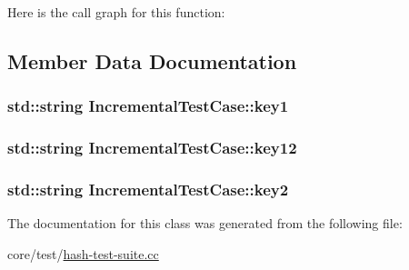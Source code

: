 Here is the call graph for this function\+:




\subsection{Member Data Documentation}
\subsubsection[{\texorpdfstring{key1}{key1}}]{\setlength{\rightskip}{0pt plus 5cm}std\+::string Incremental\+Test\+Case\+::key1\hspace{0.3cm}{\ttfamily [private]}}\hypertarget{classIncrementalTestCase_a1bb155138fa8d3fe7c2f86702623d9a6}{}\label{classIncrementalTestCase_a1bb155138fa8d3fe7c2f86702623d9a6}
\subsubsection[{\texorpdfstring{key12}{key12}}]{\setlength{\rightskip}{0pt plus 5cm}std\+::string Incremental\+Test\+Case\+::key12\hspace{0.3cm}{\ttfamily [private]}}\hypertarget{classIncrementalTestCase_afba5b3d91ad2937346bcb4279fb48e69}{}\label{classIncrementalTestCase_afba5b3d91ad2937346bcb4279fb48e69}
\subsubsection[{\texorpdfstring{key2}{key2}}]{\setlength{\rightskip}{0pt plus 5cm}std\+::string Incremental\+Test\+Case\+::key2\hspace{0.3cm}{\ttfamily [private]}}\hypertarget{classIncrementalTestCase_a0703825a7eb63a4b697ddc3d6841dc53}{}\label{classIncrementalTestCase_a0703825a7eb63a4b697ddc3d6841dc53}


The documentation for this class was generated from the following file\+:\begin{DoxyCompactItemize}
\item 
core/test/\hyperlink{hash-test-suite_8cc}{hash-\/test-\/suite.\+cc}\end{DoxyCompactItemize}
